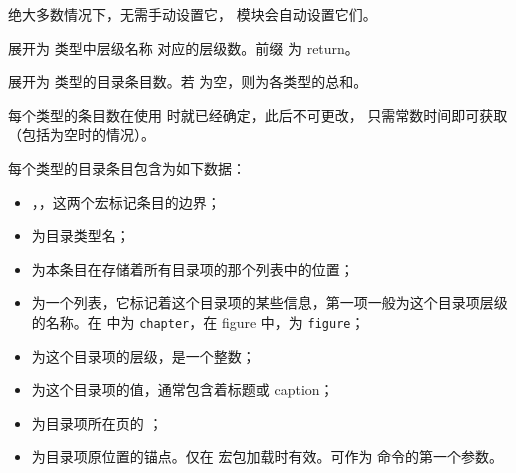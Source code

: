 \documentclass[twoside]{book}
\begin{document}
绝大多数情况下，无需手动设置它， 模块会自动设置它们。

\begin{function}[EXP]{\retcbltypelevel}
  \begin{syntax}
    \V\retcbltypelevel {} 
  \end{syntax}
展开为  类型中层级名称  对应的层级数。前缀  为 return。
\end{function}

\begin{function}[EXP]{\retcbltotalcounts}
  \begin{syntax}
    \V\retcbltotalcounts {}
  \end{syntax}
展开为  类型的目录条目数。若  为空，则为各类型的总和。

每个类型的条目数在使用  时就已经确定，此后不可更改，
只需常数时间即可获取（包括为空时的情况）。
\end{function}

每个类型的目录条目包含为如下数据：

{\centering {}\par}

\begin{itemize}[nosep]
  \item {}，，这两个宏标记条目的边界；
  \item {} 为目录类型名；
  \item {} 为本条目在存储着所有目录项的那个列表中的位置；
  \item {} 为一个列表，它标记着这个目录项的某些信息，第一项一般为这个目录项层级的名称。在  中为 \texttt{chapter}，在 figure 中，为 \texttt{figure}；
  \item {} 为这个目录项的层级，是一个整数；
  \item {} 为这个目录项的值，通常包含着标题或 caption；
  \item {} 为目录项所在页的 ；
  \item {} 为目录项原位置的锚点。仅在  宏包加载时有效。可作为  命令的第一个参数。
\end{itemize}
\end{document}
